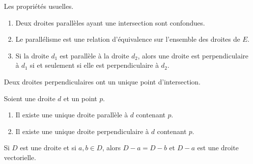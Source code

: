 \begin{proposition}     \label{PROPooADJNooMyXUxG}
    Les propriétés usuelles.
    \begin{enumerate}
        \item
            Deux droites parallèles ayant une intersection sont confondues.
        \item
            Le parallélisme est une relation d'équivalence sur l'ensemble des droites de \( E\).
        \item
            Si la droite \( d_1\) est parallèle à la droite \( d_2\), alors une droite est perpendiculaire à \( d_1\) si et seulement si elle est perpendiculaire à \( d_2\).
    \end{enumerate}
\end{proposition}

\begin{lemma}       \label{LEMooRLFQooJADark}
    Deux droites perpendiculaires ont un unique point d'intersection.
\end{lemma}

\begin{proposition}     \label{PROPooPWNWooYuyrOc}
    Soient une droite \( d\) et un point \( p\).
    \begin{enumerate}
        \item
            Il existe une unique droite parallèle à \( d\) contenant \( p\).
        \item
            Il existe une unique droite perpendiculaire à \( d\) contenant \( p\).
    \end{enumerate}
\end{proposition}

\begin{lemma}       \label{LEMooQQFFooEZYeck}
    Si \( D\) est une droite et si \( a,b\in D\), alors \( D-a=D-b\) et \( D-a\) est une droite vectorielle.
\end{lemma}

